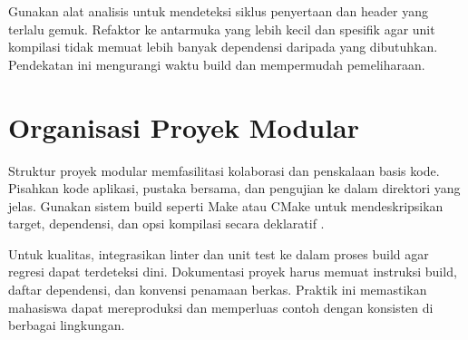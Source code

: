 \documentclass[../main.tex]{subfiles}
\begin{document}
Gunakan alat analisis untuk mendeteksi siklus penyertaan dan header yang terlalu gemuk. Refaktor ke antarmuka yang lebih kecil dan spesifik agar unit kompilasi tidak memuat lebih banyak dependensi daripada yang dibutuhkan. Pendekatan ini mengurangi waktu build dan mempermudah pemeliharaan.

\section{Organisasi Proyek Modular}
Struktur proyek modular memfasilitasi kolaborasi dan penskalaan basis kode. Pisahkan kode aplikasi, pustaka bersama, dan pengujian ke dalam direktori yang jelas. Gunakan sistem build seperti Make atau CMake untuk mendeskripsikan target, dependensi, dan opsi kompilasi secara deklaratif \parencite{gnu-c-manual,cpp-reference}.

Untuk kualitas, integrasikan linter dan unit test ke dalam proses build agar regresi dapat terdeteksi dini. Dokumentasi proyek harus memuat instruksi build, daftar dependensi, dan konvensi penamaan berkas. Praktik ini memastikan mahasiswa dapat mereproduksi dan memperluas contoh dengan konsisten di berbagai lingkungan.
\end{document}
